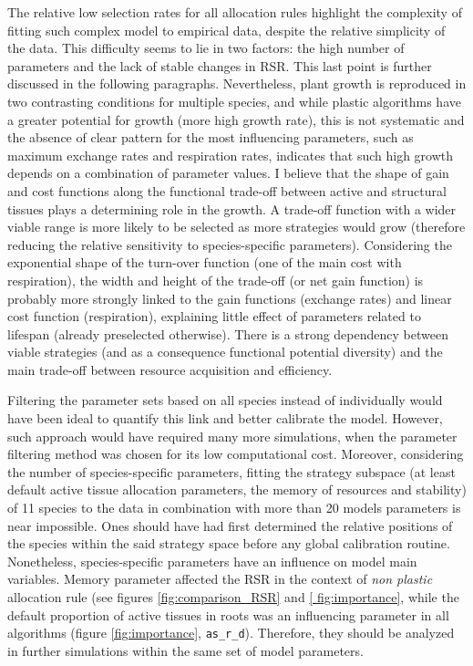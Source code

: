 The relative low selection rates for all allocation rules highlight the complexity of fitting such complex model to empirical data, despite the relative simplicity of the data. This difficulty seems to lie in two factors: the high number of parameters and the lack of stable changes in RSR. This last point is further discussed in the following paragraphs. Nevertheless, plant growth is reproduced in two contrasting conditions for multiple species, and while plastic algorithms have a greater potential for growth (more high growth rate), this is not systematic and the absence of clear pattern for the most influencing parameters, such as maximum exchange rates and respiration rates, indicates that such high growth depends on a combination of parameter values. I believe that the shape of gain and cost functions along the functional trade-off between active and structural tissues plays a determining role in the growth. A trade-off function with a wider viable range is more likely to be selected as more strategies would grow (therefore reducing the relative sensitivity to species-specific parameters). Considering the exponential shape of the turn-over function (one of the main cost with respiration), the width and height of the trade-off (or net gain function) is probably more strongly linked to the gain functions (exchange rates) and linear cost function (respiration), explaining little effect of parameters related to lifespan (already preselected otherwise). There is a strong dependency between viable strategies (and as a consequence functional potential diversity) and the main trade-off between resource acquisition and efficiency.

Filtering the parameter sets based on all species instead of individually would have been ideal to quantify this link and better calibrate the model. However, such approach would have required many more simulations, when the parameter filtering method was chosen for its low computational cost. Moreover, considering the number of species-specific parameters, fitting the strategy subspace (at least default active tissue allocation parameters, the memory of resources and stability) of 11 species to the data in combination with more than 20 models parameters is near impossible. Ones should have had first determined the relative positions of the species within the said strategy space before any global calibration routine. Nonetheless, species-specific parameters have an influence on model main variables. Memory parameter affected the RSR in the context of \textit{non plastic} allocation rule (see figures \ref{fig:comparison_RSR} and \ref{ fig:importance}, while the default proportion of active tissues in roots was an influencing parameter in all algorithms (figure \ref{fig:importance}, \texttt{as\_r\_d}). Therefore, they should be analyzed in further simulations within the same set of model parameters.

